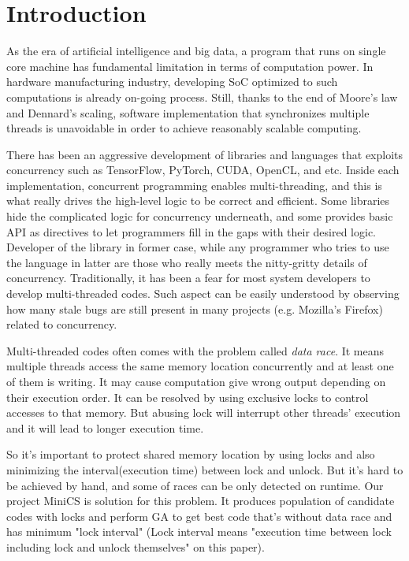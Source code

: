 \section{Introduction}
\label{sec:intro}
As the era of artificial intelligence and big data, a program that runs on single core machine has fundamental limitation in terms of computation power. In hardware manufacturing industry, developing SoC optimized to such computations is already on-going process. Still, thanks to the end of Moore's law and Dennard's scaling, software implementation that synchronizes multiple threads is unavoidable in order to achieve reasonably scalable computing.

There has been an aggressive development of libraries and languages that exploits concurrency such as TensorFlow, PyTorch, CUDA, OpenCL, and etc. Inside each implementation, concurrent programming enables multi-threading, and this is what really drives the high-level logic to be correct and efficient. Some libraries hide the complicated logic for concurrency underneath, and some provides basic API as directives to let programmers fill in the gaps with their desired logic. Developer of the library in former case, while any programmer who tries to use the language in latter are those who really meets the nitty-gritty details of concurrency. Traditionally, it has been a fear for most system developers to develop multi-threaded codes. Such aspect can be easily understood by observing how many stale bugs are still present in many projects (e.g. Mozilla's Firefox) related to concurrency.

Multi-threaded codes often comes with the problem called \textit{data race}. It means multiple threads access the same memory location concurrently and at least one of them is writing. It may cause computation give wrong output depending on their execution order. It can be resolved by using exclusive locks to control accesses to that memory. But abusing lock will interrupt other threads' execution and it will lead to longer execution time.

So it's important to protect shared memory location by using locks and also minimizing the interval(execution time) between lock and unlock. But it's hard to be achieved by hand, and some of races can be only detected on runtime.
Our project MiniCS is solution for this problem. It produces population of candidate codes with locks and perform GA to get best code that's without data race and has minimum "lock interval" (Lock interval means "execution time between lock including lock and unlock themselves" on this paper).